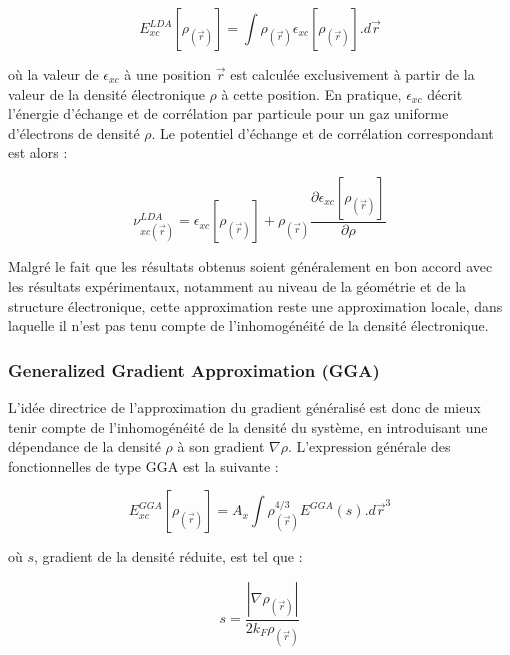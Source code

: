 	\begin{equation}
	E_{xc}^{LDA}[\rho_{(\vec{r})}] = \int \rho_{(\vec{r})} \epsilon_{xc}[\rho_{(\vec{r})}].d\vec{r}
	\end{equation}
	
	\noindent où la valeur de $\epsilon_{xc}$ à une position $\vec{r}$ est calculée exclusivement à partir de la valeur de la densité électronique $\rho$ à cette position. En pratique, $\epsilon_{xc}$ décrit l’énergie d’échange et de corrélation par particule pour un gaz uniforme d’électrons de densité $\rho$. Le potentiel d’échange et de corrélation correspondant est alors :
	
	\begin{equation}
	\nu_{xc(\vec{r})}^{LDA} = \epsilon_{xc}[\rho_{(\vec{r})}] + \rho_{(\vec{r})} \frac{\partial \epsilon_{xc}[\rho_{(\vec{r})}]}{\partial \rho}
	\end{equation}
	
	Malgré le fait que les résultats obtenus soient généralement en bon accord avec les résultats expérimentaux, notamment au niveau de la géométrie et de la structure électronique, cette approximation reste une approximation locale, dans laquelle il n'est pas tenu compte de l’inhomogénéité de la densité électronique.
	
	\subsubsection{Generalized Gradient Approximation (GGA)}
	
	L’idée directrice de l’approximation du gradient généralisé est donc de mieux tenir compte de l’inhomogénéité de la densité du système, en introduisant une dépendance de la densité $\rho$ à son gradient $\nabla \rho$. L’expression générale des fonctionnelles de type GGA est la suivante :
	
	\begin{equation}
	E_{xc}^{GGA}[\rho_{(\vec{r})}] = A_{x} \int \rho_{(\vec{r})}^{4/3} E^{GGA}(s) .d\vec{r}^{3}
	\end{equation}
	
	\noindent où $s$, gradient de la densité réduite, est tel que :
	
	\begin{equation}
	s = \frac{|\nabla \rho_{(\vec{r})}|}{2 k_{F} \rho_{(\vec{r})}}
	\end{equation}
	
